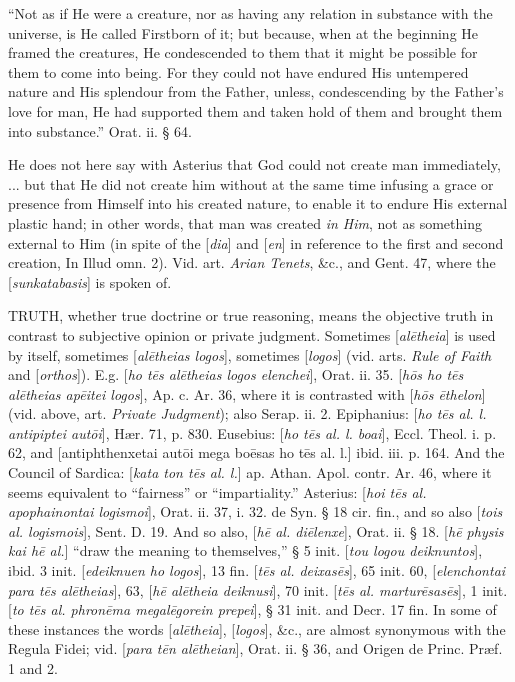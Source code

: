 ``Not as if He were a creature, nor as having any
relation in substance with the universe, is He called Firstborn of it;
but because, when at the beginning He framed the creatures, He
condescended to them that it might be possible for them to come into
being. For they could not have endured His untempered nature and His
splendour from the Father, unless, condescending by the Father's love
for man, He had supported them and taken hold of them and brought them
into substance.'' Orat. ii. § 64.

He does not here say with Asterius that God could
not create man immediately, ... but that He did not create him without
at the same time infusing a grace or presence from Himself into his
created nature, to enable it to endure His external plastic hand; in
other words, that man was created \emph{in Him}, not as something
external to Him (in spite of the [\emph{dia}] and [\emph{en}] in
reference to the first and second creation, In Illud omn. 2). Vid.
art. \emph{Arian Tenets}, \&c., and Gent. 47, where the [\emph{sunkatabasis}]
is spoken of.

\xsection{[Aletheia]}

TRUTH,
whether true doctrine or true reasoning, means the objective truth in
contrast to subjective opinion or private judgment. Sometimes [\emph{al\={e}theia}]
is used by itself, sometimes [\emph{al\={e}theias logos}],
sometimes [\emph{logos}] (vid. arts. \emph{Rule of Faith} and [\emph{orthos}]).
E.g. [\emph{ho t\={e}s al\={e}theias logos elenchei}], Orat. ii.
35. [\emph{h\={o}s ho t\={e}s al\={e}theias ap\={e}itei logos}],
Ap. c. Ar. 36, where it is contrasted with [\emph{h\={o}s \={e}thelon}]
(vid. above, art. \emph{Private Judgment}); also Serap. ii. 2.
Epiphanius: [\emph{ho t\={e}s al. l. antipiptei aut\={o}i}], Hær.
71, p. 830. Eusebius: [\emph{ho t\={e}s al. l. boai}], Eccl. Theol.
i. p. 62, and [antiphthenxetai aut\={o}i mega bo\={e}sas ho t\={e}s
al. l.] ibid. iii. p. 164. And the Council of Sardica: [\emph{kata ton t\={e}s
al. l.}] ap. Athan. Apol. contr. Ar. 46, where it seems equivalent
to ``fairness'' or ``impartiality.'' Asterius: [\emph{hoi t\={e}s al.
apophainontai logismoi}], Orat. ii. 37, i. 32. de Syn. § 18 cir.
fin., and so also [\emph{tois al. logismois}], Sent. D. 19. And so
also, [\emph{h\={e} al. di\={e}lenxe}], Orat. ii. § 18. [\emph{h\={e}
physis kai h\={e} al.}] ``draw the meaning to themselves,'' § 5
init. [\emph{tou logou deiknuntos}], ibid. 3 init. [\emph{edeiknuen ho
logos}], 13 fin. [\emph{t\={e}s al. deixas\={e}s}], 65 init.
60, [\emph{elenchontai para t\={e}s al\={e}theias}], 63, [\emph{h\={e}
al\={e}theia deiknusi}], 70 init. [\emph{t\={e}s al. martur\={e}sas\={e}s}],
1 init. [\emph{to t\={e}s al. phron\={e}ma megal\={e}gorein
prepei}], § 31 init. and Decr. 17 fin. In some of these instances
the words [\emph{al\={e}theia}], [\emph{logos}], \&c., are
almost synonymous with the Regula Fidei; vid. [\emph{para t\={e}n al\={e}theian}],
Orat. ii. § 36, and Origen de Princ. Præf. 1 and 2.

